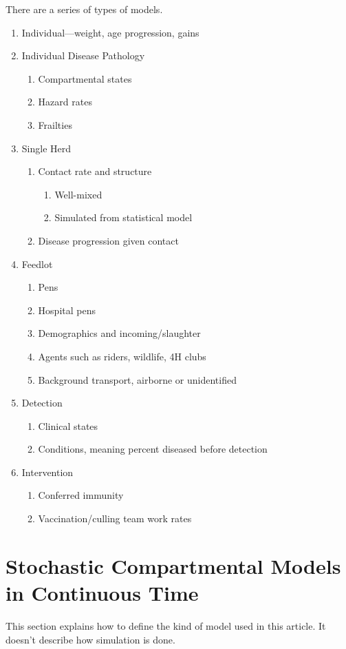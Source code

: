 \documentclass{article}
\begin{document}
There are a series of types of models.
\begin{enumerate}
  \item Individual---weight, age progression, gains
  \item Individual Disease Pathology
  \begin{enumerate}
    \item Compartmental states
    \item Hazard rates
    \item Frailties
  \end{enumerate}
  \item Single Herd
  \begin{enumerate}
    \item Contact rate and structure
    \begin{enumerate}
      \item Well-mixed
      \item Simulated from statistical model
    \end{enumerate}
    \item Disease progression given contact
  \end{enumerate}
  \item Feedlot
  \begin{enumerate}
    \item Pens
    \item Hospital pens
    \item Demographics and incoming/slaughter
    \item Agents such as riders, wildlife, 4H clubs
    \item Background transport, airborne or unidentified
  \end{enumerate}
  \item Detection
  \begin{enumerate}
    \item Clinical states
    \item Conditions, meaning percent diseased before detection
  \end{enumerate}
  \item Intervention
  \begin{enumerate}
    \item Conferred immunity
    \item Vaccination/culling team work rates
  \end{enumerate}
\end{enumerate}

\section{Stochastic Compartmental Models in Continuous Time}
This section explains how to define the kind of model used
in this article. It doesn't describe how simulation is done.
\end{document}
